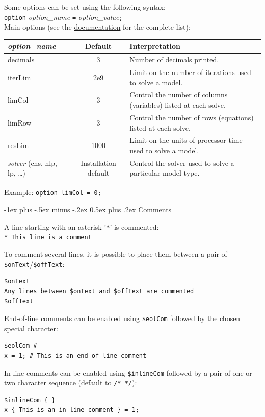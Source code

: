\documentclass[10pt,landscape,a4paper]{article}
\makeatletter
\renewcommand{\section}{\@startsection{section}{1}{0mm}%
                                {-1ex plus -.5ex minus -.2ex}%
                                {0.5ex plus .2ex}%
                                {\color{blue}\normalfont\large\bfseries}}
\makeatother
\begin{document}
\begin{multicols}{2}
Some options can be set using the following syntax:\\
\texttt{option} \emph{option\_name} \texttt{=} \emph{option\_value}\texttt{;}\\
Main options (see the
\href{https://www.gams.com/latest/docs/UG_OptionStatement.html}{documentation}
for the complete list):\\
\begin{tabularx}{\columnwidth}{@{}>{\ttfamily}lcX@{}}
  \emph{\textrm{option\_name}} & Default & Interpretation \\
  \toprule
  decimals & 3 & Number of decimals printed.\\
  iterLim& 2e9 & Limit on the number of iterations used to solve a model. \\
  limCol& 3 & Control the number of columns (variables) listed at each solve.\\
  limRow& 3 & Control the number of rows (equations) listed at each solve.\\
  resLim& 1000 & Limit on the units of processor time used to solve a model.\\
  \emph{\textrm{solver}} \textrm{(}cns\textrm{, }nlp\textrm{, }lp\textrm{, \ldots)}&
  Installation default& Control the solver used to solve a particular model type.
\end{tabularx}
Example: \texttt{option limCol = 0;}

\section{Comments}

A line starting with an asterisk '\verb!*!' is commented:\\
\verb!* This line is a comment!

To comment several lines, it is possible to place them between a pair of
\verb!$onText!/\verb!$offText!:\\
\begin{verbatim}
$onText
Any lines between $onText and $offText are commented
$offText
\end{verbatim}

End-of-line comments can be enabled using \verb!$eolCom! followed by the
chosen special character:\\
\begin{verbatim}
$eolCom #
x = 1; # This is an end-of-line comment
\end{verbatim}

In-line comments can be enabled using \verb!$inlineCom! followed by a pair of
one or two character sequence (default to \verb!/* */!):\\
\begin{verbatim}
$inlineCom { }
x { This is an in-line comment } = 1;
\end{verbatim}


\end{multicols}
\end{document}

